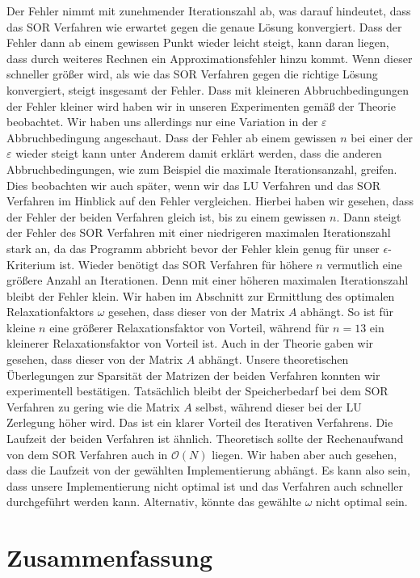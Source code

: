 \documentclass[smallheadings]{scrartcl}
\theoremstyle{definition}
\begin{document}
Der Fehler nimmt mit zunehmender Iterationszahl ab, was darauf hindeutet, dass das SOR Verfahren wie erwartet gegen die genaue Lösung konvergiert. Dass der Fehler dann ab einem gewissen Punkt wieder leicht steigt, kann daran liegen, dass durch weiteres Rechnen ein Approximationsfehler hinzu kommt.  Wenn dieser schneller größer wird, als wie das SOR Verfahren gegen die richtige Lösung konvergiert, steigt insgesamt der Fehler.  Dass mit kleineren Abbruchbedingungen der Fehler kleiner wird haben wir in unseren Experimenten gemäß der Theorie beobachtet.  Wir haben uns allerdings nur eine Variation in der $\varepsilon$ Abbruchbedingung angeschaut. Dass der Fehler ab einem gewissen $n$ bei einer der $\varepsilon$ wieder steigt kann unter Anderem damit erklärt werden, dass die anderen Abbruchbedingungen, wie zum Beispiel die maximale Iterationsanzahl, greifen. Dies beobachten wir auch später, wenn wir das LU Verfahren und das SOR Verfahren im Hinblick auf den Fehler vergleichen. Hierbei haben wir gesehen, dass der Fehler der beiden Verfahren gleich ist,  bis zu einem gewissen $n$. Dann steigt der Fehler des SOR Verfahren mit einer niedrigeren maximalen Iterationszahl stark an, da das Programm abbricht bevor der Fehler klein genug für unser $\epsilon$-Kriterium ist.  Wieder benötigt das SOR Verfahren für höhere $n$ vermutlich eine größere Anzahl an Iterationen. Denn mit einer höheren maximalen Iterationszahl bleibt der Fehler klein. Wir haben im Abschnitt zur Ermittlung des optimalen Relaxationfaktors $\omega$ gesehen, dass dieser von der Matrix $A$ abhängt. So ist für kleine $n$ eine größerer Relaxationsfaktor von Vorteil, während für $n=13$ ein kleinerer Relaxationsfaktor von Vorteil ist. Auch in der Theorie gaben wir gesehen, dass dieser von der Matrix $A$ abhängt.  Unsere theoretischen Überlegungen zur Sparsität der Matrizen der beiden Verfahren konnten wir experimentell bestätigen. Tatsächlich bleibt der Speicherbedarf bei dem SOR Verfahren zu gering wie die Matrix $A$ selbst, während dieser bei der LU Zerlegung höher wird. Das ist ein klarer Vorteil des Iterativen Verfahrens. Die Laufzeit der beiden Verfahren ist ähnlich. Theoretisch sollte der Rechenaufwand von dem SOR Verfahren auch in $\mathcal{O}(N)$ liegen. Wir haben aber auch gesehen,  dass die Laufzeit von der gewählten Implementierung abhängt. Es kann also sein, dass unsere Implementierung nicht optimal ist und das Verfahren auch schneller durchgeführt werden kann.  Alternativ, könnte das gewählte $\omega $ nicht optimal sein.
\section{Zusammenfassung}
\end{document}
